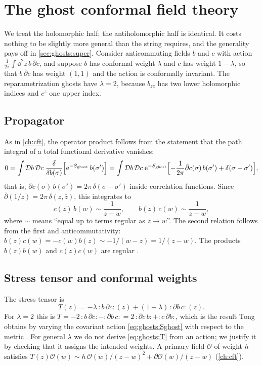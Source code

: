 \section{The ghost conformal field theory}\label{sec:ghosts:cft}

We treat the holomorphic half; the antiholomorphic half is identical. It costs nothing to be
slightly more general than the string requires, and the generality pays off in
\cref{sec:ghosts:super}. Consider anticommuting fields $b$ and $c$ with action
$\frac{1}{2\pi}\int\dd^2z\,b\,\bar\partial c$, and suppose $b$ has conformal weight $\lambda$ and
$c$ has weight $1-\lambda$, so that $b\,\bar\partial c$ has weight $(1,1)$ and the action is
conformally invariant. The reparametrization ghosts have $\lambda=2$, because $b_{zz}$ has two
lower holomorphic indices and $c^z$ one upper index.

\subsection{Propagator}

As in \cref{ch:cft}, the operator product follows from the statement that the path integral
of a total functional derivative vanishes:
\[
  0=\int\mathcal Db\,\mathcal Dc\;\frac{\delta}{\delta b(\sigma)}
  \Bigl[\mathrm{e}^{-S_{\mathrm{ghost}}}\,b(\sigma')\Bigr]
  =\int\mathcal Db\,\mathcal Dc\;\mathrm{e}^{-S_{\mathrm{ghost}}}
  \Bigl[-\frac{1}{2\pi}\bar\partial c(\sigma)\,b(\sigma')+\delta(\sigma-\sigma')\Bigr],
\]
that is, $\bar\partial c(\sigma)\,b(\sigma')=2\pi\,\delta(\sigma-\sigma')$ inside correlation
functions. Since $\bar\partial(1/z)=2\pi\,\delta(z,\bar z)$, this integrates to
\begin{equation}\label{eq:ghosts:bcope}
  c(z)\,b(w)\sim\frac{1}{z-w},\qquad b(z)\,c(w)\sim\frac{1}{z-w},
\end{equation}
where $\sim$ means ``equal up to terms regular as $z\to w$''. The second relation follows
from the first and anticommutativity: $b(z)c(w)=-c(w)b(z)\sim-1/(w-z)=1/(z-w)$. The products
$b(z)b(w)$ and $c(z)c(w)$ are regular .

\subsection{Stress tensor and conformal weights}

The stress tensor is
\begin{equation}\label{eq:ghosts:T}
  T(z)=-\lambda\,{:}b\,\partial c{:}(z)+(1-\lambda)\,{:}\partial b\,c{:}(z) .
\end{equation}
For $\lambda=2$ this is $T=-2\,{:}b\,\partial c{:}-{:}\partial b\,c{:}
=2\,{:}\partial c\,b{:}+{:}c\,\partial b{:}$, which is the result Tong obtains by varying the
covariant action \cref{eq:ghosts:Sghost} with respect to the metric
. For general $\lambda$ we do not derive
\cref{eq:ghosts:T} from an action; we justify it by checking that it assigns the intended
weights. A primary field $\mathcal O$ of weight $h$ satisfies
$T(z)\mathcal O(w)\sim h\,\mathcal O(w)/(z-w)^2+\partial\mathcal O(w)/(z-w)$
(\cref{ch:cft}).

